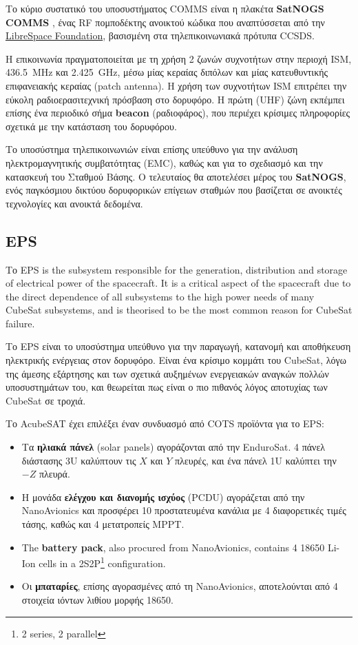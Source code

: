 \documentclass[a4paper,nobib]{tufte-book}
\begin{document}
Το κύριο συστατικό του υποσυστήματος \acs{COMMS} είναι η πλακέτα \textbf{SatNOGS COMMS} \autocite{surligas_satnogscomms_2021}, ένας \acs{RF} πομποδέκτης ανοικτού κώδικα που αναπτύσσεται από την \href{https://libre.space/}{LibreSpace Foundation}, βασισμένη στα τηλεπικοινωνιακά πρότυπα \acs{CCSDS}.

Η επικοινωνία πραγματοποιείται με τη χρήση 2 ζωνών συχνοτήτων στην περιοχή \acs{ISM}, \SI{436.5}{\mega\hertz} και \SI{2.425}{\giga\hertz}, μέσω μίας κεραίας διπόλων και μίας κατευθυντικής επιφανειακής κεραίας (patch antenna). Η χρήση των συχνοτήτων \acs{ISM} επιτρέπει την εύκολη ραδιοερασιτεχνική πρόσβαση στο δορυφόρο. Η πρώτη (\acs{UHF}) ζώνη εκπέμπει επίσης ένα περιοδικό σήμα \textbf{beacon} (ραδιοφάρος), που περιέχει κρίσιμες πληροφορίες σχετικά με την κατάσταση του δορυφόρου.

Το υποσύστημα τηλεπικοινωνιών είναι επίσης υπεύθυνο για την ανάλυση ηλεκτρομαγνητικής συμβατότητας (\acs{EMC}), καθώς και για το σχεδιασμό και την κατασκευή του Σταθμού Βάσης. Ο τελευταίος θα αποτελέσει μέρος του \textbf{SatNOGS}\autocite{white_overview_satellite_2018}, ενός παγκόσμιου δικτύου δορυφορικών επίγειων σταθμών που βασίζεται σε ανοικτές τεχνολογίες και ανοικτά δεδομένα.

\subsection{\acf{EPS}}
Το  \ac{EPS} is the subsystem responsible for the generation, distribution and storage of electrical power of the spacecraft. It is a critical aspect of the spacecraft due to the direct dependence of all subsystems to the high power needs of many CubeSat subsystems, and is theorised to be the most common reason for CubeSat failure.\autocite{langer_reliability_cubesats_2016}

Το \ac{EPS} είναι το υποσύστημα υπεύθυνο για την παραγωγή, κατανομή και αποθήκευση ηλεκτρικής ενέργειας στον δορυφόρο. Είναι ένα κρίσιμο κομμάτι του CubeSat, λόγω της άμεσης εξάρτησης και των σχετικά αυξημένων ενεργειακών αναγκών πολλών υποσυστημάτων του, και θεωρείται πως είναι ο πιο πιθανός λόγος αποτυχίας των CubeSat σε τροχιά. \autocite{langer_reliability_cubesats_2016}

Το AcubeSAT έχει επιλέξει έναν συνδυασμό από \ac{COTS} προϊόντα για το \ac{EPS}:\autocite{DDJF_SYS}
\begin{itemize}
	\item Τα \textbf{ηλιακά πάνελ} (solar panels) αγοράζονται από την EnduroSat. 4 πάνελ διάστασης 3U καλύπτουν τις \(X\) και \(Y\) πλευρές, και ένα πάνελ 1U καλύπτει την \(-Z\) πλευρά.
	\item Η μονάδα \textbf{ελέγχου και διανομής ισχύος} (\ac{PCDU}) αγοράζεται από την NanoAvionics και προσφέρει 10 προστατευμένα κανάλια με 4 διαφορετικές τιμές τάσης, καθώς και 4 μετατροπείς \ac{MPPT}.
	\item The \textbf{battery pack}, also procured from NanoAvionics, contains 4 18650 Li-Ion cells in a 2S2P\footnote{2 series, 2 parallel} configuration.
	\item Οι \textbf{μπαταρίες}, επίσης αγορασμένες από τη NanoAvionics, αποτελούνται από 4 στοιχεία ιόντων λιθίου μορφής 18650.
\end{itemize}
\end{document}
